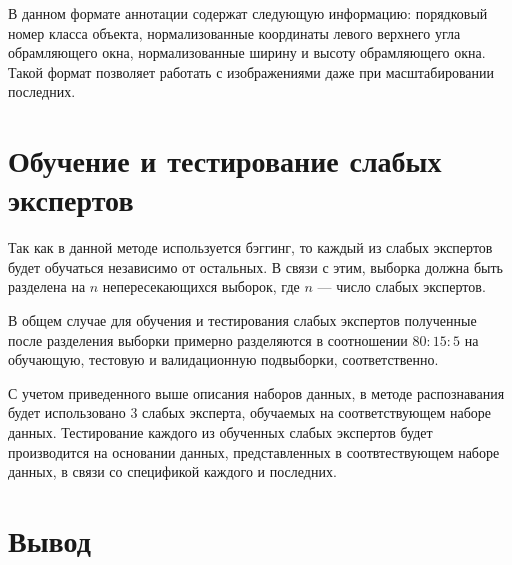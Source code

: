 
В данном формате аннотации содержат следующую информацию: порядковый номер класса объекта, нормализованные координаты левого верхнего угла обрамляющего окна, нормализованные ширину и высоту обрамляющего окна. Такой формат позволяет работать с изображениями даже при масштабировании последних.

\section{Обучение и тестирование слабых экспертов}

Так как в данной методе используется бэггинг, то каждый из слабых экспертов будет обучаться независимо от остальных. В связи с этим, выборка должна быть разделена на $n$ непересекающихся выборок, где $n$ --- число слабых экспертов.

В общем случае для обучения и тестирования слабых экспертов полученные после разделения выборки примерно разделяются в соотношении $80:15:5$ на обучающую, тестовую и валидационную подвыборки, соответственно.

С учетом приведенного выше описания наборов данных, в методе распознавания будет использовано 3 слабых эксперта, обучаемых на соответствующем наборе данных. Тестирование каждого из обученных слабых экспертов будет производится на основании данных, представленных в соотвтествующем наборе данных, в связи со спецификой каждого и последних.

\section{Вывод}